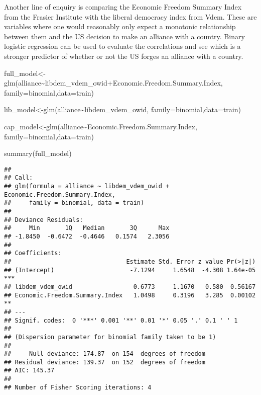 \documentclass[
]{article}
\newenvironment{Shaded}{\begin{snugshade}}{\end{snugshade}}
\newcommand{\AttributeTok}[1]{\textcolor[rgb]{0.77,0.63,0.00}{#1}}
\newcommand{\FunctionTok}[1]{\textcolor[rgb]{0.00,0.00,0.00}{#1}}
\newcommand{\NormalTok}[1]{#1}
\newcommand{\OtherTok}[1]{\textcolor[rgb]{0.56,0.35,0.01}{#1}}
\newcommand{\SpecialCharTok}[1]{\textcolor[rgb]{0.00,0.00,0.00}{#1}}
\begin{document}
Another line of enquiry is comparing the Economic Freedom Summary Index
from the Frasier Institute with the liberal democracy index from Vdem.
These are variables where one would reasonably only expect a monotonic
relationship between them and the US decision to make an alliance with a
country. Binary logistic regression can be used to evaluate the
correlations and see which is a stronger predictor of whether or not the
US forges an alliance with a country.

\begin{Shaded}
\begin{Highlighting}[]
\NormalTok{full\_model}\OtherTok{\textless{}{-}}\FunctionTok{glm}\NormalTok{(alliance}\SpecialCharTok{\textasciitilde{}}\NormalTok{libdem\_vdem\_owid}\SpecialCharTok{+}\NormalTok{Economic.Freedom.Summary.Index,}
                \AttributeTok{family=}\NormalTok{binomial,}\AttributeTok{data=}\NormalTok{train) }

\NormalTok{lib\_model}\OtherTok{\textless{}{-}}\FunctionTok{glm}\NormalTok{(alliance}\SpecialCharTok{\textasciitilde{}}\NormalTok{libdem\_vdem\_owid,}
                \AttributeTok{family=}\NormalTok{binomial,}\AttributeTok{data=}\NormalTok{train) }

\NormalTok{cap\_model}\OtherTok{\textless{}{-}}\FunctionTok{glm}\NormalTok{(alliance}\SpecialCharTok{\textasciitilde{}}\NormalTok{Economic.Freedom.Summary.Index,}
                \AttributeTok{family=}\NormalTok{binomial,}\AttributeTok{data=}\NormalTok{train) }
\end{Highlighting}
\end{Shaded}

\begin{Shaded}
\begin{Highlighting}[]
\FunctionTok{summary}\NormalTok{(full\_model)}
\end{Highlighting}
\end{Shaded}

\begin{verbatim}
## 
## Call:
## glm(formula = alliance ~ libdem_vdem_owid + Economic.Freedom.Summary.Index, 
##     family = binomial, data = train)
## 
## Deviance Residuals: 
##     Min       1Q   Median       3Q      Max  
## -1.8450  -0.6472  -0.4646   0.1574   2.3056  
## 
## Coefficients:
##                                Estimate Std. Error z value Pr(>|z|)    
## (Intercept)                     -7.1294     1.6548  -4.308 1.64e-05 ***
## libdem_vdem_owid                 0.6773     1.1670   0.580  0.56167    
## Economic.Freedom.Summary.Index   1.0498     0.3196   3.285  0.00102 ** 
## ---
## Signif. codes:  0 '***' 0.001 '**' 0.01 '*' 0.05 '.' 0.1 ' ' 1
## 
## (Dispersion parameter for binomial family taken to be 1)
## 
##     Null deviance: 174.87  on 154  degrees of freedom
## Residual deviance: 139.37  on 152  degrees of freedom
## AIC: 145.37
## 
## Number of Fisher Scoring iterations: 4
\end{verbatim}
\end{document}
